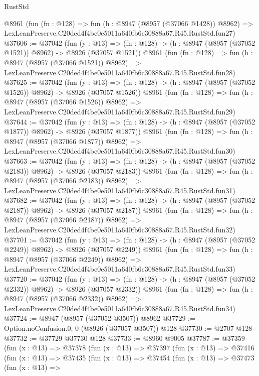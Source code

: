 \begin{lexlean}{RustStd}
\begin{coremodule}
    @8961
    (fun (fn : @128) =>
    fun (h : @8947 (@8957 (@37066 @1428)) @8962) =>
    LexLeanPreserve.C20ded4f4be0e5011a640fb6c30888a67.R45.RustStd.fun27)
@37606 := @37042
    (fun (y : @13) =>
    (fn : @128) -> (h : @8947 (@8957 (@37052 @1521)) @8962) -> @8926 (@37057 @1521))
    @8961
    (fun (fn : @128) =>
    fun (h : @8947 (@8957 (@37066 @1521)) @8962) =>
    LexLeanPreserve.C20ded4f4be0e5011a640fb6c30888a67.R45.RustStd.fun28)
@37625 := @37042
    (fun (y : @13) =>
    (fn : @128) -> (h : @8947 (@8957 (@37052 @1526)) @8962) -> @8926 (@37057 @1526))
    @8961
    (fun (fn : @128) =>
    fun (h : @8947 (@8957 (@37066 @1526)) @8962) =>
    LexLeanPreserve.C20ded4f4be0e5011a640fb6c30888a67.R45.RustStd.fun29)
@37644 := @37042
    (fun (y : @13) =>
    (fn : @128) -> (h : @8947 (@8957 (@37052 @1877)) @8962) -> @8926 (@37057 @1877))
    @8961
    (fun (fn : @128) =>
    fun (h : @8947 (@8957 (@37066 @1877)) @8962) =>
    LexLeanPreserve.C20ded4f4be0e5011a640fb6c30888a67.R45.RustStd.fun30)
@37663 := @37042
    (fun (y : @13) =>
    (fn : @128) -> (h : @8947 (@8957 (@37052 @2183)) @8962) -> @8926 (@37057 @2183))
    @8961
    (fun (fn : @128) =>
    fun (h : @8947 (@8957 (@37066 @2183)) @8962) =>
    LexLeanPreserve.C20ded4f4be0e5011a640fb6c30888a67.R45.RustStd.fun31)
@37682 := @37042
    (fun (y : @13) =>
    (fn : @128) -> (h : @8947 (@8957 (@37052 @2187)) @8962) -> @8926 (@37057 @2187))
    @8961
    (fun (fn : @128) =>
    fun (h : @8947 (@8957 (@37066 @2187)) @8962) =>
    LexLeanPreserve.C20ded4f4be0e5011a640fb6c30888a67.R45.RustStd.fun32)
@37701 := @37042
    (fun (y : @13) =>
    (fn : @128) -> (h : @8947 (@8957 (@37052 @2249)) @8962) -> @8926 (@37057 @2249))
    @8961
    (fun (fn : @128) =>
    fun (h : @8947 (@8957 (@37066 @2249)) @8962) =>
    LexLeanPreserve.C20ded4f4be0e5011a640fb6c30888a67.R45.RustStd.fun33)
@37720 := @37042
    (fun (y : @13) =>
    (fn : @128) -> (h : @8947 (@8957 (@37052 @2332)) @8962) -> @8926 (@37057 @2332))
    @8961
    (fun (fn : @128) =>
    fun (h : @8947 (@8957 (@37066 @2332)) @8962) =>
    LexLeanPreserve.C20ded4f4be0e5011a640fb6c30888a67.R45.RustStd.fun34)
@37724 := @8947 (@8957 (@37052 @3507)) @8962
@37729 := Option.noConfusion.{0, 0} (@8926 (@37057 @3507)) @128
@37730 := @2707 @128
@37732 := @37729 @37730 @128
@37733 := @8960 @9005
@37787 := @37359
    (fun (x : @13) =>
    @37378
      (fun (x : @13) =>
      @37397
        (fun (x : @13) =>
        @37416
          (fun (x : @13) =>
          @37435
            (fun (x : @13) =>
            @37454
              (fun (x : @13) =>
              @37473
                (fun (x : @13) =>

\end{coremodule}
\end{lexlean}
